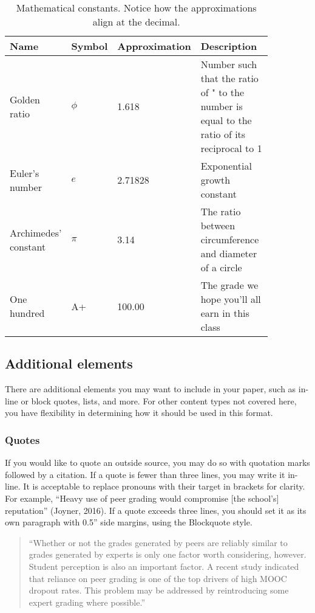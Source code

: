 \documentclass[
	letterpaper, %
]{jdf}
\begin{document}
\begin{table}[h] %
	\caption{Mathematical constants. Notice how the approximations align at the decimal.}
	\small %
	\centering %
	\begin{tabular}{L{0.17\linewidth} C{0.12\linewidth} L{0.17\linewidth} L{0.4\linewidth}}
		\textbf{Name} & \textbf{Symbol} & \textbf{Approximation} & \textbf{Description} \\
		\toprule[0.5pt]
		Golden ratio & $\phi$ & 1.618 & Number such that the ratio of " to the number is equal to the ratio of its reciprocal to 1\\
		\midrule
		Euler's number & $e$ & 2.71828 & Exponential growth constant\\
		\midrule
		Archimedes' constant & $\pi$ & 3.14 & The ratio between circumference and diameter of a circle\\
		\midrule
		One hundred & A+ & 100.00 & The grade we hope you’ll all earn in this class\\
	\end{tabular}
\end{table}

\subsection{Additional elements}
There are additional elements you may want to include in your paper, such as in-line or block quotes, lists, and more. For other content types not covered here, you have flexibility in determining how it should be used in this format.

\subsubsection{Quotes}
If you would like to quote an outside source, you may do so with quotation marks followed by a citation. If a quote is fewer than three lines, you may write it in-line. It is acceptable to replace pronouns with their target in brackets for clarity. For example, “Heavy use of peer grading would compromise [the school’s] reputation” (Joyner, 2016). If a quote exceeds three lines, you should set it as its own paragraph with 0.5” side margins, using the Blockquote style.

\begin{quotation}
	\noindent “Whether or not the grades generated by peers are reliably similar to grades generated by experts is only one factor worth considering, however. Student perception is also an important factor. A recent study indicated that reliance on peer grading is one of the top drivers of high MOOC dropout rates. This problem may be addressed by reintroducing some expert grading where possible.” %
\end{quotation}
\end{document}
